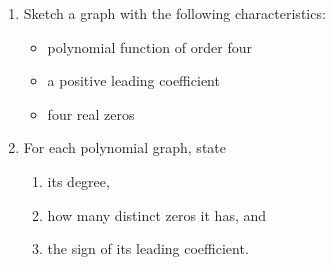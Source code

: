 \documentclass[12pt, oneside]{article}
\begin{document}
\begin{enumerate}
\newpage

\item Sketch a graph with the following characteristics: 
\begin{itemize}
\item polynomial function of order four
\item a positive leading coefficient
\item four real zeros
\end{itemize}
\begin{center}
\end{center}

\newpage

\item For each polynomial graph, state 
\begin{enumerate}
\item its degree,
\item how many distinct zeros it has, and
\item the sign of its leading coefficient.
\end{enumerate}


\end{enumerate}
\end{document}

